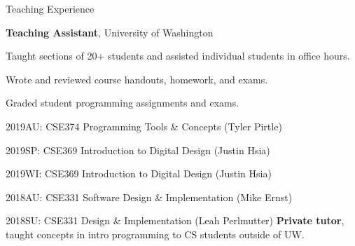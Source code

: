 \begin{rubric}{Teaching Experience}

\entry*[2018 -- 2019]%
	\textbf{Teaching Assistant}, University of Washington
	\par Taught sections of 20+ students and assisted individual students in office hours.
	\par Wrote and reviewed course handouts, homework, and exams.
	\par Graded student programming assignments and exams.
	\par 2019AU: CSE374 Programming Tools \& Concepts (Tyler Pirtle)
	\par 2019SP: CSE369 Introduction to Digital Design (Justin Hsia)
	\par 2019WI: CSE369 Introduction to Digital Design (Justin Hsia)
	\par 2018AU: CSE331 Software Design \& Implementation (Mike Ernst)
	\par  2018SU: CSE331 Design \& Implementation (Leah Perlmutter)
\entry*[2017]%
	\textbf{Private tutor}, taught concepts in intro programming to CS students outside of UW.
\end{rubric}